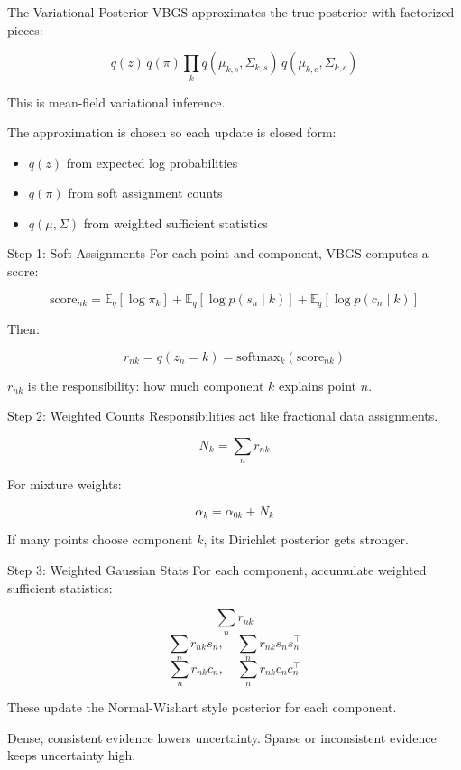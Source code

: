 \documentclass[aspectratio=169]{beamer}
\begin{document}
\begin{frame}{The Variational Posterior}
  VBGS approximates the true posterior with factorized pieces:

  \[
    q(z)\,q(\pi)\prod_k q(\mu_{k,s},\Sigma_{k,s})\,q(\mu_{k,c},\Sigma_{k,c})
  \]

  \vspace{0.8em}
  This is mean-field variational inference.

  \vspace{0.8em}
  The approximation is chosen so each update is closed form:

  \begin{itemize}
    \item \(q(z)\) from expected log probabilities
    \item \(q(\pi)\) from soft assignment counts
    \item \(q(\mu,\Sigma)\) from weighted sufficient statistics
  \end{itemize}
\end{frame}

\begin{frame}{Step 1: Soft Assignments}
  For each point and component, VBGS computes a score:

  \[
    \mathrm{score}_{nk}
    =
    \mathbb{E}_q[\log \pi_k]
    + \mathbb{E}_q[\log p(s_n \mid k)]
    + \mathbb{E}_q[\log p(c_n \mid k)]
  \]

  Then:

  \[
    r_{nk} = q(z_n = k) = \mathrm{softmax}_k(\mathrm{score}_{nk})
  \]

  \vspace{0.8em}
  \(r_{nk}\) is the responsibility: how much component \(k\) explains point \(n\).
\end{frame}

\begin{frame}{Step 2: Weighted Counts}
  Responsibilities act like fractional data assignments.

  \[
    N_k = \sum_n r_{nk}
  \]

  For mixture weights:

  \[
    \alpha_k = \alpha_{0k} + N_k
  \]

  \vspace{0.8em}
  If many points choose component \(k\), its Dirichlet posterior gets stronger.
\end{frame}

\begin{frame}{Step 3: Weighted Gaussian Stats}
  For each component, accumulate weighted sufficient statistics:

  \[
    \sum_n r_{nk}
  \]
  \[
    \sum_n r_{nk}s_n,\quad \sum_n r_{nk}s_ns_n^\top
  \]
  \[
    \sum_n r_{nk}c_n,\quad \sum_n r_{nk}c_nc_n^\top
  \]

  These update the Normal-Wishart style posterior for each component.

  \vspace{0.8em}
  Dense, consistent evidence lowers uncertainty. Sparse or inconsistent
  evidence keeps uncertainty high.
\end{frame}
\end{document}

